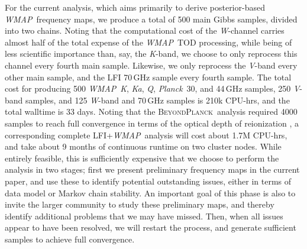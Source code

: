 \documentclass[twocolumn]{../../common/aa}
\def\WMAP{\emph{WMAP}}
\def\Planck{\emph{Planck}}
\newcommand{\bp}{\textsc{BeyondPlanck}}
\newcommand{\K}[0]{\textit K}
\newcommand{\Ka}[0]{\textit{Ka}}
\newcommand{\Q}[0]{\textit Q}
\newcommand{\V}[0]{\textit V}
\newcommand{\W}[0]{\textit W}
\begin{document}
For the current analysis, which aims primarily to derive posterior-based \WMAP\ frequency maps, we produce a total of 500 main Gibbs samples, divided into two chains. Noting that the computational cost of the \W-channel carries almost half of the total expense of the \WMAP\ TOD processing, while being of less scientific importance than, say, the \K-band, we choose to only reprocess this channel every fourth main sample. Likewise, we only reprocess the \V-band every other main sample, and the LFI 70\,GHz sample every fourth sample. The total cost for producing 500 \WMAP\ \K, \Ka, \Q, \Planck\ 30, and 44\,GHz samples, 250 \V-band samples, and 125 \W-band and 70\,GHz samples is 210k CPU-hrs, and the total walltime is 33 days. Noting that the \bp\ analysis required 4000 samples to reach full convergence in terms of the optical depth of reionization \citep{bp12}, a corresponding complete LFI+\WMAP\ analysis will cost about 1.7M CPU-hrs, and take about 9 months of continuous runtime on two cluster nodes. While entirely feasible, this is sufficiently expensive that we choose to perform the analysis in two stages; first we present preliminary frequency maps in the current paper, and use these to identify potential outstanding issues, either in terms of data model or Markov chain stability. An important goal of this phase is also to invite the larger community to study these preliminary maps, and thereby identify additional problems that we may have missed. Then, when all issues appear to have been resolved, we will restart the process, and generate sufficient samples to achieve full convergence.











\end{document}
